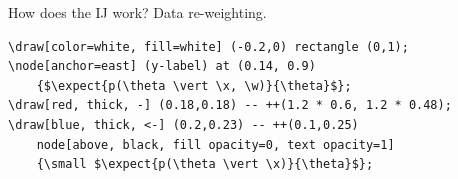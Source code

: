\documentclass[8pt]{beamer}\usepackage[]{graphicx}\usepackage[]{color}
\def\expect#1#2{\underset{#1}{\mathbb{E}}\left[#2\right]}
\def\x{x}
\def\w{w}
\begin{document}
\begin{frame}[fragile]{How does the IJ work?  Data re-weighting.}
\hrulefill


\begin{lstlisting}
\draw[color=white, fill=white] (-0.2,0) rectangle (0,1);
\node[anchor=east] (y-label) at (0.14, 0.9)
    {$\expect{p(\theta \vert \x, \w)}{\theta}$};
\draw[red, thick, -] (0.18,0.18) -- ++(1.2 * 0.6, 1.2 * 0.48);
\draw[blue, thick, <-] (0.2,0.23) -- ++(0.1,0.25)
    node[above, black, fill opacity=0, text opacity=1]
    {\small $\expect{p(\theta \vert \x)}{\theta}$};
\end{lstlisting}

\end{frame}





\end{document}
